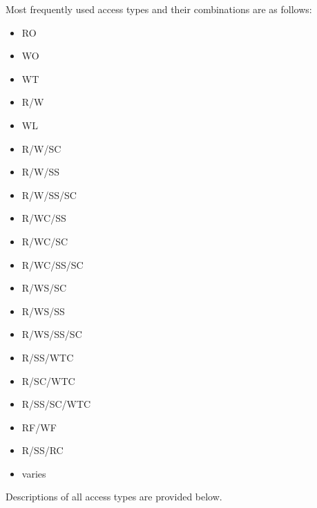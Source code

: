 Most frequently used access types and their combinations are as follows:

\begin{multicols}{4}
  \begin{itemize}
    \item RO
    \item WO
    \item WT
    \item R/W
    \item WL
    \item R/W/SC
    \item R/W/SS
    \item R/W/SS/SC
    \item R/WC/SS
    \item R/WC/SC
    \item R/WC/SS/SC
    \item R/WS/SC
    \item R/WS/SS
    \item R/WS/SS/SC
    \item R/SS/WTC
    \item R/SC/WTC
    \item R/SS/SC/WTC
    \item RF/WF
    \item R/SS/RC
    \item varies
  \end{itemize}
\end{multicols}

Descriptions of all access types are provided below.


